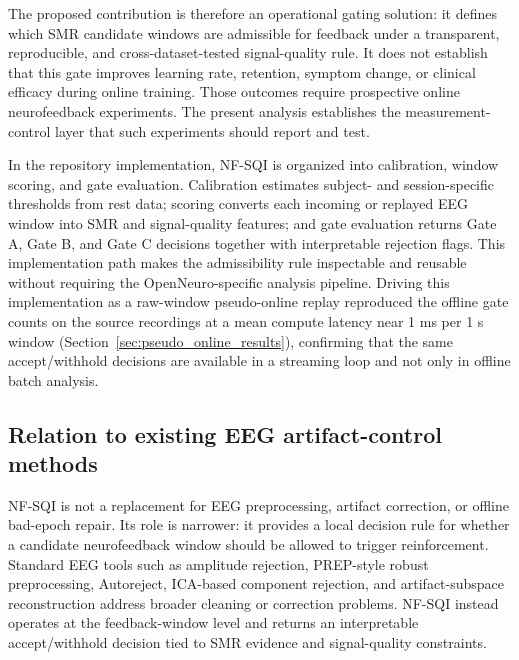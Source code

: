 \documentclass[preprint,12pt]{elsarticle}
\begin{document}
The proposed contribution is therefore an operational gating solution: it defines which SMR candidate windows are admissible for feedback under a transparent, reproducible, and cross-dataset-tested signal-quality rule. It does not establish that this gate improves learning rate, retention, symptom change, or clinical efficacy during online training. Those outcomes require prospective online neurofeedback experiments. The present analysis establishes the measurement-control layer that such experiments should report and test.

In the repository implementation, NF-SQI is organized into calibration, window scoring, and gate evaluation. Calibration estimates subject- and session-specific thresholds from rest data; scoring converts each incoming or replayed EEG window into SMR and signal-quality features; and gate evaluation returns Gate A, Gate B, and Gate C decisions together with interpretable rejection flags. This implementation path makes the admissibility rule inspectable and reusable without requiring the OpenNeuro-specific analysis pipeline. Driving this implementation as a raw-window pseudo-online replay reproduced the offline gate counts on the source recordings at a mean compute latency near 1 ms per 1 s window (Section~\ref{sec:pseudo_online_results}), confirming that the same accept/withhold decisions are available in a streaming loop and not only in offline batch analysis.

\subsection{Relation to existing EEG artifact-control methods}

NF-SQI is not a replacement for EEG preprocessing, artifact correction, or offline bad-epoch repair. Its role is narrower: it provides a local decision rule for whether a candidate neurofeedback window should be allowed to trigger reinforcement. Standard EEG tools such as amplitude rejection, PREP-style robust preprocessing, Autoreject, ICA-based component rejection, and artifact-subspace reconstruction address broader cleaning or correction problems. NF-SQI instead operates at the feedback-window level and returns an interpretable accept/withhold decision tied to SMR evidence and signal-quality constraints.
\end{document}
